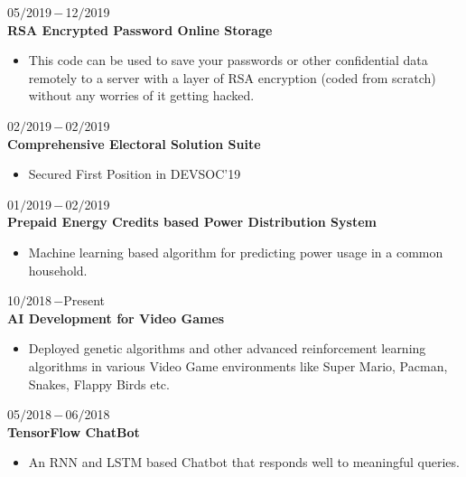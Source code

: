 \documentclass[a4paper, 12pt]{article}
\begin{document}
    \begin{flushleft}
    	05$/$2019\,$-$\,12$/$2019\\
    	\textbf{RSA Encrypted Password Online Storage}
    	\begin{itemize}
    		\item This code can be used to save your passwords or other confidential data remotely to a server with a layer of RSA encryption (coded from scratch) without any worries of it getting hacked.
    	\end{itemize}
    \end{flushleft}
    
    \begin{flushleft}
    	02$/$2019\,$-$\,02$/$2019\\
    	\textbf{Comprehensive Electoral Solution Suite}
    	\begin{itemize}
    		\item Secured First Position in DEVSOC'19
    	\end{itemize}
    \end{flushleft}
    
    \begin{flushleft}
    	01$/$2019\,$-$\,02$/$2019\\
    	\textbf{Prepaid Energy Credits based Power Distribution System}
    	\begin{itemize}
    		\item Machine learning based algorithm for predicting power usage in a common household.
    	\end{itemize}
    \end{flushleft}    
    
    \begin{flushleft}
    	10$/$2018\,$-$Present\\
    	\textbf{AI Development for Video Games}
    	\begin{itemize}
    		\item Deployed genetic algorithms and other advanced reinforcement learning algorithms in various
Video Game environments like Super Mario, Pacman, Snakes, Flappy Birds etc.
    	\end{itemize}
    \end{flushleft}
    
    \begin{flushleft}
    	05$/$2018\,$-$\,06$/$2018\\
    	\textbf{TensorFlow ChatBot}
    	\begin{itemize}
    		\item An RNN and LSTM based Chatbot that responds well to meaningful queries.
    	\end{itemize}
    \end{flushleft}
    
\end{document}
